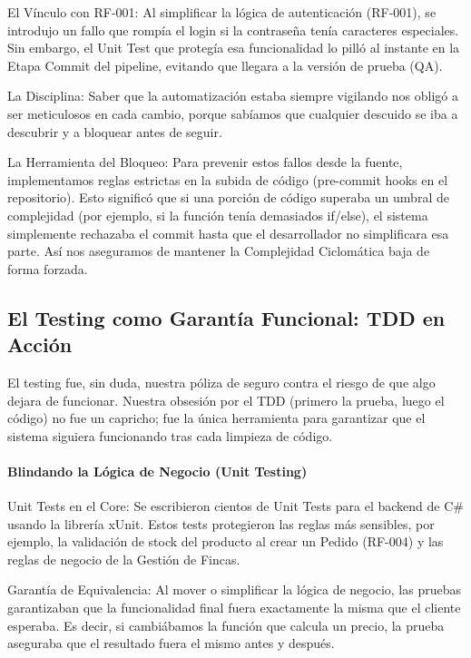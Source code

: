 El Vínculo con RF-001: Al simplificar la lógica de autenticación (RF-001), se introdujo un fallo que rompía el login si la contraseña tenía caracteres especiales. Sin embargo, el Unit Test que protegía esa funcionalidad lo pilló al instante en la Etapa Commit del pipeline, evitando que llegara a la versión de prueba (QA).

La Disciplina: Saber que la automatización estaba siempre vigilando nos obligó a ser meticulosos en cada cambio, porque sabíamos que cualquier descuido se iba a descubrir y a bloquear antes de seguir.

La Herramienta del Bloqueo: Para prevenir estos fallos desde la fuente, implementamos reglas estrictas en la subida de código (pre-commit hooks en el repositorio). Esto significó que si una porción de código superaba un umbral de complejidad (por ejemplo, si la función tenía demasiados if/else), el sistema simplemente rechazaba el commit hasta que el desarrollador no simplificara esa parte. Así nos aseguramos de mantener la Complejidad Ciclomática baja de forma forzada.

\subsection{El Testing como Garantía Funcional: TDD en Acción}

El testing fue, sin duda, nuestra póliza de seguro contra el riesgo de que algo dejara de funcionar. Nuestra obsesión por el TDD (primero la prueba, luego el código) no fue un capricho; fue la única herramienta para garantizar que el sistema siguiera funcionando tras cada limpieza de código.

\paragraph{Blindando la Lógica de Negocio (Unit Testing)}

Unit Tests en el Core: Se escribieron cientos de Unit Tests para el backend de C\# usando la librería xUnit. Estos tests protegieron las reglas más sensibles, por ejemplo, la validación de stock del producto al crear un Pedido (RF-004) y las reglas de negocio de la Gestión de Fincas.

Garantía de Equivalencia: Al mover o simplificar la lógica de negocio, las pruebas garantizaban que la funcionalidad final fuera exactamente la misma que el cliente esperaba. Es decir, si cambiábamos la función que calcula un precio, la prueba aseguraba que el resultado fuera el mismo antes y después.

